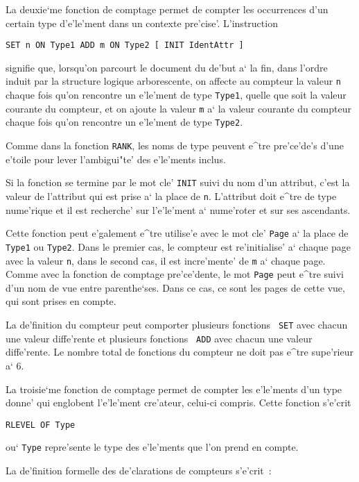 {La deuxie`me fonction de comptage permet de compter les occurrences d'un
certain type d'e'le'ment dans un contexte pre'cise'. L'instruction
\begin{verbatim}
SET n ON Type1 ADD m ON Type2 [ INIT IdentAttr ]
\end{verbatim}
signifie que, lorsqu'on parcourt le document du de'but a` la fin, dans l'ordre
induit par la structure logique arborescente, on affecte au compteur la valeur
{\tt n} chaque fois qu'on rencontre un e'le'ment de type {\tt Type1}, quelle
que soit la valeur courante du compteur, et on ajoute la valeur {\tt m} a`
la valeur courante du compteur chaque fois qu'on rencontre un e'le'ment de
type {\tt Type2}.

Comme dans la fonction {\tt RANK}, les noms de type peuvent e^tre pre'ce'de's
d'une e'toile pour lever l'ambigui"te' des e'le'ments inclus.

Si la fonction se termine par le mot cle' {\tt INIT} suivi du nom d'un
attribut, c'est la valeur de l'attribut qui est prise a` la place de {\tt n}.
L'attribut doit e^tre de type nume'rique et il est recherche' sur l'e'le'ment
a` nume'roter et sur ses ascendants.

Cette fonction peut e'galement e^tre utilise'e avec le mot cle' {\tt Page} a`
la place de {\tt Type1} ou {\tt Type2}. Dans le premier cas, le compteur est
re'initialise' a` chaque page avec la valeur {\tt n}, dans le second cas, il
est incre'mente' de {\tt m} a` chaque page. Comme avec la fonction de comptage
pre'ce'dente, le mot {\tt Page} peut e^tre suivi d'un nom de vue entre
parenthe`ses. Dans ce cas, ce sont les pages de cette vue, qui sont prises
en compte.

La de'finition du compteur peut comporter plusieurs fonctions {\tt
SET} avec chacun une valeur diffe'rente et plusieurs fonctions {\tt
ADD} avec chacun une valeur diffe'rente. Le nombre total de fonctions
du compteur ne doit pas e^tre supe'rieur a` 6.

La troisie`me fonction de comptage permet de compter les e'le'ments
d'un type donne' qui englobent l'e'le'ment cre'ateur, celui-ci compris.
Cette fonction s'e'crit
\begin{verbatim}
RLEVEL OF Type
\end{verbatim}
ou` {\tt Type} repre'sente le type des e'le'ments que l'on prend en compte.

La de'finition formelle des de'clarations de compteurs s'e'crit~:

}

